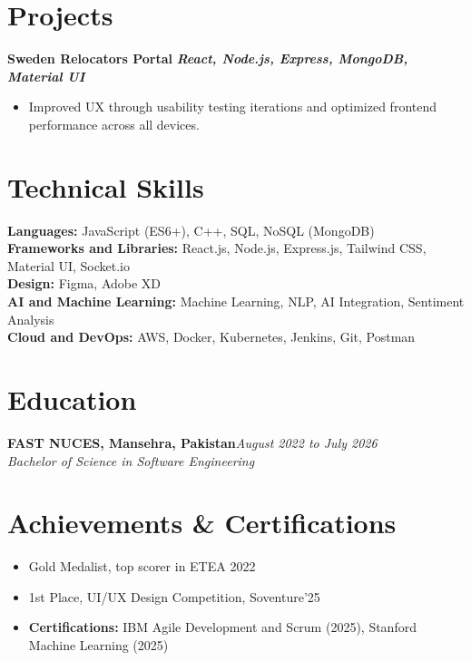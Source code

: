 \documentclass[11pt,letterpaper]{article}
\begin{document}
\section{Projects}
\textbf{Sweden Relocators Portal} \textbar{} \textbf{\textit{React, Node.js, Express, MongoDB, Material UI}}
\begin{itemize}
  \item Improved UX through usability testing iterations and optimized frontend performance across all devices.
\end{itemize}



\section{Technical Skills}
\textbf{Languages:} JavaScript (ES6+), C++, SQL, NoSQL (MongoDB)\\[0.1em]
\textbf{Frameworks and Libraries:} React.js, Node.js, Express.js, Tailwind CSS, Material UI, Socket.io\\[0.1em]
\textbf{Design:} Figma, Adobe XD\\[0.1em]
\textbf{AI and Machine Learning:} Machine Learning, NLP, AI Integration, Sentiment Analysis\\[0.1em]
\textbf{Cloud and DevOps:} AWS, Docker, Kubernetes, Jenkins, Git, Postman



\section{Education}
\textbf{FAST NUCES, Mansehra, Pakistan}\hfill\textit{August 2022 to July 2026}\\
\textit{Bachelor of Science in Software Engineering}



\section{Achievements \& Certifications}
\begin{itemize}
  \item Gold Medalist, top scorer in ETEA 2022
  \item 1st Place, UI/UX Design Competition, Soventure'25
  \item \textbf{Certifications:} IBM Agile Development and Scrum (2025), Stanford Machine Learning (2025)
\end{itemize}
\end{document}
